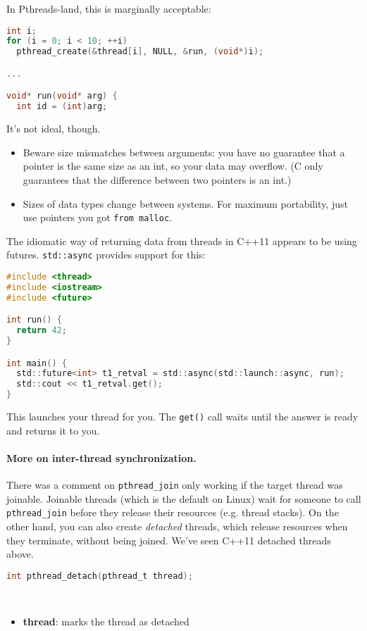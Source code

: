 In Pthreads-land, this is marginally acceptable:
\begin{lstlisting}[language=C]
int i;
for (i = 0; i < 10; ++i)
  pthread_create(&thread[i], NULL, &run, (void*)i);

...

void* run(void* arg) {
  int id = (int)arg;
\end{lstlisting}
It's not ideal, though.
  \begin{itemize}
    \item Beware size mismatches between arguments: you have
      no guarantee that a pointer is the same size as an int, so your data
      may overflow. (C only guarantees that the difference between two pointers is an int.)
    \item Sizes of data types change between systems. For maximum
      portability, just use pointers you got {\tt from malloc}.
  \end{itemize}

  The idiomatic way of returning data from threads in C++11 appears to be using
  futures. {\tt std::async} provides support for this:
\begin{lstlisting}[language=C]
#include <thread>
#include <iostream>
#include <future>

int run() {
  return 42;
}

int main() {
  std::future<int> t1_retval = std::async(std::launch::async, run);
  std::cout << t1_retval.get();
}
\end{lstlisting}
This launches your thread for you. The {\tt get()} call waits until the answer
is ready and returns it to you.

\paragraph{More on inter-thread synchronization.} There was a comment on {\tt pthread\_join}
only working if the target thread was joinable. Joinable threads
(which is the default on Linux) wait for someone to call {\tt pthread\_join}
before they release their resources (e.g. thread stacks). On the other
hand, you can also create \emph{detached} threads, which release
resources when they terminate, without being joined. We've seen C++11 detached
threads above.

\begin{lstlisting}[language=C]
int pthread_detach(pthread_t thread);
\end{lstlisting}
~\vspace*{-3em}
\begin{itemize}
\item  {\bf thread}: marks the thread as detached
\end{itemize}

